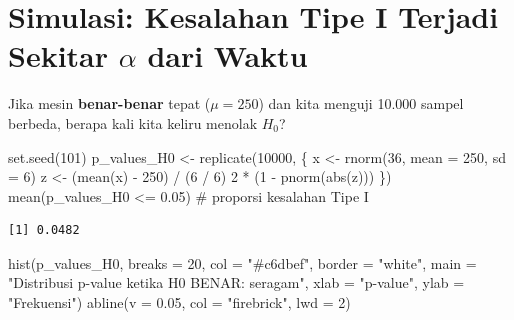 \documentclass[
  indonesian,
  letterpaper,
]{book}
\newenvironment{Shaded}{\begin{snugshade}}{\end{snugshade}}
\newcommand{\AttributeTok}[1]{\textcolor[rgb]{0.40,0.45,0.13}{#1}}
\newcommand{\CommentTok}[1]{\textcolor[rgb]{0.37,0.37,0.37}{#1}}
\newcommand{\DecValTok}[1]{\textcolor[rgb]{0.68,0.00,0.00}{#1}}
\newcommand{\FloatTok}[1]{\textcolor[rgb]{0.68,0.00,0.00}{#1}}
\newcommand{\FunctionTok}[1]{\textcolor[rgb]{0.28,0.35,0.67}{#1}}
\newcommand{\NormalTok}[1]{\textcolor[rgb]{0.00,0.23,0.31}{#1}}
\newcommand{\OtherTok}[1]{\textcolor[rgb]{0.00,0.23,0.31}{#1}}
\newcommand{\SpecialCharTok}[1]{\textcolor[rgb]{0.37,0.37,0.37}{#1}}
\newcommand{\StringTok}[1]{\textcolor[rgb]{0.13,0.47,0.30}{#1}}
\begin{document}
\section{\texorpdfstring{Simulasi: Kesalahan Tipe I Terjadi Sekitar
\(\alpha\) dari
Waktu}{Simulasi: Kesalahan Tipe I Terjadi Sekitar \textbackslash alpha dari Waktu}}\label{simulasi-kesalahan-tipe-i-terjadi-sekitar-alpha-dari-waktu}

Jika mesin \textbf{benar-benar} tepat (\(\mu = 250\)) dan kita menguji
10.000 sampel berbeda, berapa kali kita keliru menolak \(H_0\)?

\begin{Shaded}
\begin{Highlighting}[]
\FunctionTok{set.seed}\NormalTok{(}\DecValTok{101}\NormalTok{)}
\NormalTok{p\_values\_H0 }\OtherTok{\textless{}{-}} \FunctionTok{replicate}\NormalTok{(}\DecValTok{10000}\NormalTok{, \{}
\NormalTok{  x }\OtherTok{\textless{}{-}} \FunctionTok{rnorm}\NormalTok{(}\DecValTok{36}\NormalTok{, }\AttributeTok{mean =} \DecValTok{250}\NormalTok{, }\AttributeTok{sd =} \DecValTok{6}\NormalTok{)}
\NormalTok{  z }\OtherTok{\textless{}{-}}\NormalTok{ (}\FunctionTok{mean}\NormalTok{(x) }\SpecialCharTok{{-}} \DecValTok{250}\NormalTok{) }\SpecialCharTok{/}\NormalTok{ (}\DecValTok{6} \SpecialCharTok{/} \DecValTok{6}\NormalTok{)}
  \DecValTok{2} \SpecialCharTok{*}\NormalTok{ (}\DecValTok{1} \SpecialCharTok{{-}} \FunctionTok{pnorm}\NormalTok{(}\FunctionTok{abs}\NormalTok{(z)))}
\NormalTok{\})}
\FunctionTok{mean}\NormalTok{(p\_values\_H0 }\SpecialCharTok{\textless{}=} \FloatTok{0.05}\NormalTok{)   }\CommentTok{\# proporsi kesalahan Tipe I}
\end{Highlighting}
\end{Shaded}

\begin{verbatim}
[1] 0.0482
\end{verbatim}

\begin{Shaded}
\begin{Highlighting}[]
\FunctionTok{hist}\NormalTok{(p\_values\_H0, }\AttributeTok{breaks =} \DecValTok{20}\NormalTok{, }\AttributeTok{col =} \StringTok{"\#c6dbef"}\NormalTok{, }\AttributeTok{border =} \StringTok{"white"}\NormalTok{,}
     \AttributeTok{main =} \StringTok{"Distribusi p{-}value ketika H0 BENAR: seragam"}\NormalTok{, }\AttributeTok{xlab =} \StringTok{"p{-}value"}\NormalTok{, }\AttributeTok{ylab =} \StringTok{"Frekuensi"}\NormalTok{)}
\FunctionTok{abline}\NormalTok{(}\AttributeTok{v =} \FloatTok{0.05}\NormalTok{, }\AttributeTok{col =} \StringTok{"firebrick"}\NormalTok{, }\AttributeTok{lwd =} \DecValTok{2}\NormalTok{)}
\end{Highlighting}
\end{Shaded}
\end{document}
